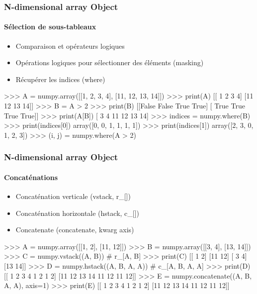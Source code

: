 \begin{frame}[fragile]
\frametitle{N-dimensional array Object}
\framesubtitle{Sélection de sous-tableaux}
\begin{itemize}
 \item Comparaison et opérateurs logiques
 \item Opérations logiques pour sélectionner des éléments (masking)
 \item Récupérer les indices (where)
\end{itemize}
\begin{pythonConsole}
>>> A = numpy.array([[1, 2, 3, 4], [11, 12, 13, 14]])
>>> print(A)
[[ 1  2  3  4]
 [11 12 13 14]]
>>> B = A > 2
>>> print(B)
[[False False  True  True]
 [ True  True  True  True]]
>>> print(A[B])
[ 3  4 11 12 13 14]
>>> indices = numpy.where(B)
>>> print(indices[0])
array([0, 0, 1, 1, 1, 1])
>>> print(indices[1])
array([2, 3, 0, 1, 2, 3])
>>> (i, j) = numpy.where(A > 2)
\end{pythonConsole}
\end{frame}
\begin{frame}[fragile]
\frametitle{N-dimensional array Object}
\framesubtitle{Concaténations}
\begin{itemize}
 \item Concaténation verticale (vstack, r\_[])
 \item Concaténation horizontale (hstack, c\_[])
 \item Concatenate (concatenate, kwarg axis)
\end{itemize}
\begin{pythonConsole}
>>> A = numpy.array([[1, 2], [11, 12]])
>>> B = numpy.array([[3, 4], [13, 14]])
>>> C = numpy.vstack((A, B)) # r\_[A, B]
>>> print(C)
[[ 1  2]
 [11 12]
 [ 3  4]
 [13 14]]
>>> D = numpy.hstack((A, B, A, A)) # c\_[A, B, A, A]
>>> print(D)
[[ 1  2  3  4  1  2  1  2]
 [11 12 13 14 11 12 11 12]]
>>> E = numpy.concatenate((A, B, A, A), axis=1)
>>> print(E)
[[ 1  2  3  4  1  2  1  2]
 [11 12 13 14 11 12 11 12]]
\end{pythonConsole}
\end{frame}
